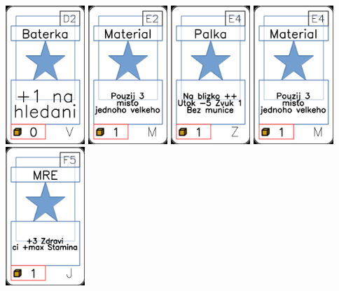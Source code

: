 \documentclass[a4paper]{article}
\begin{document}
	\includegraphics[width=3.0cm]{img-1_76}
	\includegraphics[width=3.0cm]{img-1_51}
	\includegraphics[width=3.0cm]{img-1_83}
	\includegraphics[width=3.0cm]{img-1_53}
	\includegraphics[width=3.0cm]{img-1_29}
\end{document}
